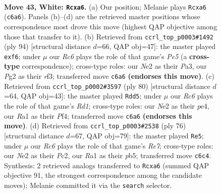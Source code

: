 \documentclass[11pt]{article}
\begin{document}
\clearpage

\begin{figure}[p]\centering
\begin{subfigure}{0.46\textwidth}\centering
\resizebox{\linewidth}{!}{%
\newchessgame
\chessboard[
  setfen={1r6/8/p1Rp1kp1/4rn1p/1p5P/8/4NpP1/R4K2 w - - 0 43},
  showmover=false,
  pgfstyle=straightmove, color=movearrow, markmove={c6-a6}
]}
\caption{}
\end{subfigure}\hfill
\begin{subfigure}{0.46\textwidth}\centering
\resizebox{\linewidth}{!}{%
\newchessgame
\chessboard[
  setfen={8/p7/2R2pk1/4P1p1/5n2/P4r1p/1R5K/8 w - - 0 48},
  showmover=false,
  pgfstyle=straightmove, color=movearrow, markmove={e5-f6}
]}
\caption{}
\end{subfigure}
\\[4pt]
\begin{subfigure}{0.46\textwidth}\centering
\resizebox{\linewidth}{!}{%
\newchessgame
\chessboard[
  setfen={3r4/5k2/1prn2p1/1Np1R2p/4pP1P/8/1P2PK2/3R4 w - - 4 41},
  showmover=false,
  pgfstyle=straightmove, color=movearrow, markmove={d1-d5}
]}
\caption{}
\end{subfigure}\hfill
\begin{subfigure}{0.46\textwidth}\centering
\resizebox{\linewidth}{!}{%
\newchessgame
\chessboard[
  setfen={5rk1/4Rp1p/p4RpP/1p4P1/2r5/8/1PP5/1K6 w - - 8 39},
  showmover=false,
  pgfstyle=straightmove, color=movearrow, markmove={e7-e5}
]}
\caption{}
\end{subfigure}
\caption{\textbf{Move 43, White: \texttt{Rcxa6}.} (a) Our position; Melanie plays \texttt{Rcxa6} (\texttt{c6a6}). Panels (b)--(d) are the retrieved master positions whose correspondence most drove this move (highest QAP objective among those that transfer to it). (b) Retrieved from \texttt{ccrl\_top\_p0003\#1492} (ply 94) [structural distance $d$=66, QAP obj=47]: the master played \texttt{exf6}; under $\mu$ our \emph{Rc6} plays the role of that game's \emph{Pe5} (a \textbf{cross-type} correspondence); cross-type roles: our \emph{N}e2 as their \emph{P}a3, our \emph{P}g2 as their \emph{r}f3; transferred move \texttt{c6a6} \textbf{(endorses this move)}. (c) Retrieved from \texttt{ccrl\_top\_p0002\#3597} (ply 80) [structural distance $d$=64, QAP obj=43]: the master played \texttt{Rdd5}; under $\mu$ our \emph{Rc6} plays the role of that game's \emph{Rd1}; cross-type roles: our \emph{N}e2 as their \emph{p}e4, our \emph{R}a1 as their \emph{P}f4; transferred move \texttt{c6a6} \textbf{(endorses this move)}. (d) Retrieved from \texttt{ccrl\_top\_p0003\#2538} (ply 76) [structural distance $d$=67, QAP obj=79]: the master played \texttt{Re5}; under $\mu$ our \emph{Rc6} plays the role of that game's \emph{Re7}; cross-type roles: our \emph{N}e2 as their \emph{P}c2, our \emph{R}a1 as their \emph{p}b5; transferred move \texttt{c6c4}. Synthesis: 2 retrieved analogs transferred to \texttt{Rcxa6} (summed QAP objective 91, the strongest correspondence among the candidate moves); Melanie committed it via the \texttt{search} selector.}
\label{fig:thought-m84}
\end{figure}
\end{document}

